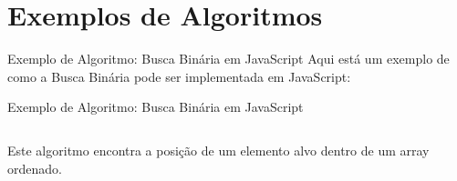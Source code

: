 \section{Exemplos de Algoritmos}

\begin{frame}[fragile]{Exemplo de Algoritmo: Busca Binária em JavaScript}
Aqui está um exemplo de como a Busca Binária pode ser implementada em JavaScript:
\end{frame}

\begin{frame}[fragile]{Exemplo de Algoritmo: Busca Binária em JavaScript}
\inputminted[fontsize=\scriptsize]{javascript}{binarySearch.js}

Este algoritmo encontra a posição de um elemento alvo dentro de um array ordenado.
\end{frame}
